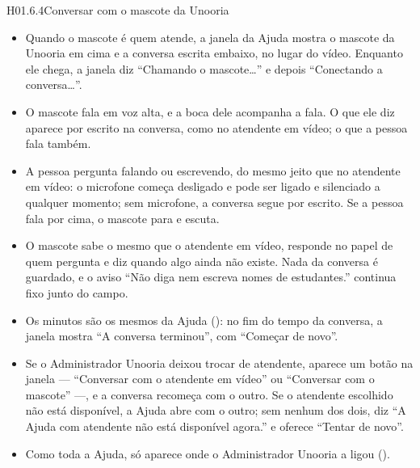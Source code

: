 \begin{historia}{H01.6.4}{Conversar com o mascote da Unooria}{\pronto}
\aceite
\begin{itemize}
  \item Quando o mascote é quem atende, a janela da Ajuda mostra o mascote da
    Unooria em cima e a conversa escrita embaixo, no lugar do vídeo. Enquanto
    ele chega, a janela diz \enquote{Chamando o mascote\ldots} e depois
    \enquote{Conectando a conversa\ldots}.
  \item O mascote fala em voz alta, e a boca dele acompanha a fala. O que ele
    diz aparece por escrito na conversa, como no atendente em vídeo; o que a
    pessoa fala também.
  \item A pessoa pergunta falando ou escrevendo, do mesmo jeito que no
    atendente em vídeo: o microfone começa desligado e pode ser ligado e
    silenciado a qualquer momento; sem microfone, a conversa segue por escrito.
    Se a pessoa fala por cima, o mascote para e escuta.
  \item O mascote sabe o mesmo que o atendente em vídeo, responde no papel de
    quem pergunta e diz quando algo ainda não existe. Nada da conversa é
    guardado, e o aviso \enquote{Não diga nem escreva nomes de estudantes.}
    continua fixo junto do campo.
  \item Os minutos são os mesmos da Ajuda (): no fim do tempo da
    conversa, a janela mostra \enquote{A conversa terminou}, com
    \enquote{Começar de novo}.
  \item Se o Administrador Unooria deixou trocar de atendente, aparece um botão
    na janela --- \enquote{Conversar com o atendente em vídeo} ou
    \enquote{Conversar com o mascote} ---, e a conversa recomeça com o outro.
    Se o atendente escolhido não está disponível, a Ajuda abre com o outro;
    sem nenhum dos dois, diz \enquote{A Ajuda com atendente não está
    disponível agora.} e oferece \enquote{Tentar de novo}.
  \item Como toda a Ajuda, só aparece onde o Administrador Unooria a ligou
    ().
\end{itemize}
\end{historia}
